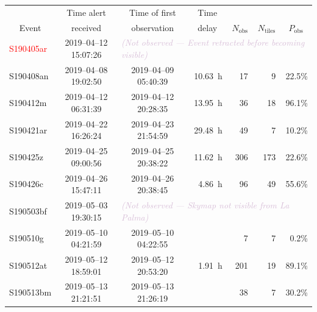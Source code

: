 \begin{colsection}
\begin{table}[t]
    \begin{footnotesize}
    \begin{center}
        \begin{tabular}{l|ccrrrr} %
                                       & Time alert & Time of first & \multicolumn{1}{c}{Time}  &                &                  &                                    \\
            \multicolumn{1}{c|}{Event} & received   & observation   & \multicolumn{1}{c}{delay} & $N_\text{obs}$ & $N_\text{tiles}$ & \multicolumn{1}{c}{$P_\text{obs}$} \\
            \midrule
            \textcolor{Red}{S190405ar} & 2019--04--12 15:07:26 & \multicolumn{5}{l}{\textcolor{Thistle}{\textit{(Not observed --- Event retracted before becoming visible)}}} \\
                            S190408an  & 2019--04--08 19:02:50 & 2019--04--09 05:40:39 &              \SI{10.63}{\hour} &  17 &   9 & 22.5\% \\
                            S190412m   & 2019--04--12 06:31:39 & 2019--04--12 20:28:35 &              \SI{13.95}{\hour} &  36 &  18 & 96.1\% \\
                            S190421ar  & 2019--04--22 16:26:24 & 2019--04--23 21:54:59 &              \SI{29.48}{\hour} &  49 &   7 & 10.2\% \\
                            S190425z   & 2019--04--25 09:00:56 & 2019--04--25 20:38:22 &              \SI{11.62}{\hour} & 306 & 173 & 22.6\% \\
                            S190426c   & 2019--04--26 15:47:11 & 2019--04--26 20:38:45 &              \SI{ 4.86}{\hour} &  96 &  49 & 55.6\% \\
                            S190503bf  & 2019--05--03 19:30:15 & \multicolumn{5}{l}{\textcolor{Thistle}{\textit{(Not observed --- Skymap not visible from La Palma)}}} \\
                            S190510g   & 2019--05--10 04:21:59 & 2019--05--10 04:22:55 &  {NavyBlue}{56\,s} &   7 &   7 &  0.2\% \\
                            S190512at  & 2019--05--12 18:59:01 & 2019--05--12 20:53:20 &              \SI{ 1.91}{\hour} & 201 &  19 & 89.1\% \\
                            S190513bm  & 2019--05--13 21:21:51 & 2019--05--13 21:26:19 & {NavyBlue}{4\,min} &  38 &   7 & 30.2\% \\

\end{tabular}
\end{center}
\end{footnotesize}
\end{table}
\end{colsection}
